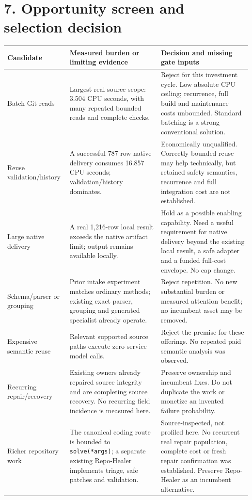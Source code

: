 \documentclass[11pt,letterpaper]{article}
\newcommand{\code}[1]{{\small\nolinkurl{#1}}}
\newcommand{\sect}[1]{\section*{#1}}
\begin{document}
\sect{7. Opportunity screen and selection decision}
\small
\begin{tabularx}{\linewidth}{@{}>{\raggedright\arraybackslash}p{.23\linewidth}Y Y@{}}
\toprule
\textbf{Candidate} & \textbf{Measured burden or limiting evidence} & \textbf{Decision and missing gate inputs}\\
\midrule
Batch Git reads & Largest real source scope: 3.504 CPU seconds, with many repeated bounded reads and complete checks. & Reject for this investment cycle. Low absolute CPU ceiling; recurrence, full build and maintenance costs unbounded. Standard batching is a strong conventional solution.\\
Reuse validation/history & A successful 787-row native delivery consumes 16.857 CPU seconds; validation/history dominates. & Economically unqualified. Correctly bounded reuse may help technically, but retained safety semantics, recurrence and full integration cost are not established.\\
Large native delivery & A real 1,216-row local result exceeds the native artifact limit; output remains available locally. & Hold as a possible enabling capability. Need a useful requirement for native delivery beyond the existing local result, a safe adapter and a funded full-cost envelope. No cap change.\\
Schema/parser or grouping & Prior intake experiment matches ordinary methods; existing exact parser, grouping and generated specialist already operate. & Reject repetition. No new substantial burden or measured attention benefit; no incumbent asset may be removed.\\
Expensive semantic reuse & Relevant supported source paths execute zero service-model calls. & Reject the premise for these offerings. No repeated paid semantic analysis was observed.\\
Recurring repair/recovery & Existing owners already repaired source integrity and are completing source recovery. No recurring field incidence is measured here. & Preserve ownership and incumbent fixes. Do not duplicate the work or monetize an invented failure probability.\\
Richer repository work & The canonical coding route is bounded to \code{solve(*args)}; a separate existing Repo-Healer implements triage, safe patches and validation. & Source-inspected, not profiled here. No recurrent real repair population, complete cost or fresh repair confirmation was established. Preserve Repo-Healer as an incumbent alternative.\\
\bottomrule
\end{tabularx}
\normalsize
\end{document}
